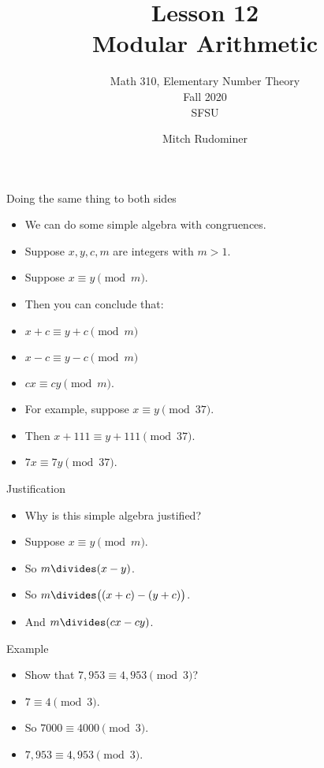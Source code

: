 \documentclass{beamer}
\title{Lesson 12 \\ Modular Arithmetic}
\subtitle{Math 310, Elementary Number Theory \\ Fall 2020 \\ SFSU}
\author{Mitch Rudominer}
\date{}
\begin{document}
\begin{frame}
  \titlepage
\end{frame}

\begin{frame}{Doing the same thing to both sides}

\begin{itemize}
  \item We can do some simple algebra with congruences.
  \item Suppose $x,y,c,m$ are integers with $m>1$.
  \item Suppose $x\equiv y \pmod m$.
  \item Then you can conclude that:
  \item $x+c\equiv y+c \pmod m$
  \item $x-c\equiv y-c \pmod m$
  \item $cx \equiv cy \pmod m$.
  \item For example, suppose $x\equiv y \pmod {37}$.
  \item Then $x+111\equiv y+111 \pmod {37}$.
  \item $7x \equiv 7y \pmod {37}$.
\end{itemize}

\end{frame}

\begin{frame}{Justification}

\begin{itemize}
  \item Why is this simple algebra justified?
  \item Suppose $x\equiv y \pmod m$.
  \item So $m \divides (x-y)$.
  \item So $m \divides \big( (x+c) - (y+c) \big)$.
  \item And $m \divides (cx - cy)$.
\end{itemize}

\end{frame}

\begin{frame}{Example}

\begin{itemize}
  \item Show that $7,953 \equiv  4,953 \pmod 3$?
  \item $7\equiv 4  \pmod 3$.
  \item So $7000 \equiv 4000 \pmod 3$.
  \item $7,953 \equiv  4,953 \pmod 3$.
\end{itemize}

\end{frame}
\end{document}
